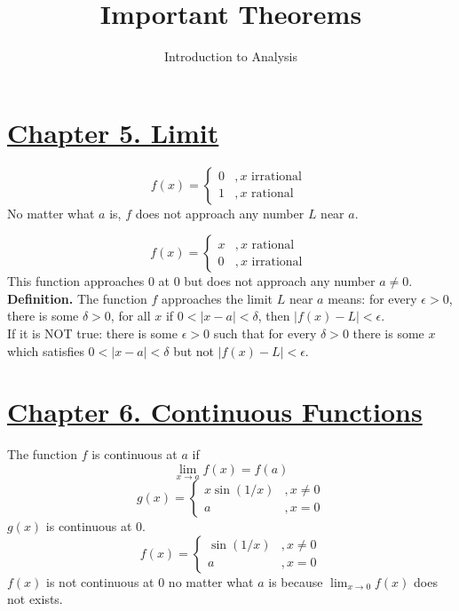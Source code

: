 \documentclass[10pt,letterpaper]{article}
\title{\textbf{Important Theorems}}
\author{Introduction to Analysis}
\begin{document}
\maketitle

\setlength{\parindent}{0pt}
\setlength{\parskip}{1ex}
	\section*{{\color{red}\underline{Chapter 5. Limit}}}
	$$f(x) = 
	\begin{cases}
	0 &, x \text{ irrational } \\
	1 &, x \text{ rational } 	
	\end{cases}
	$$
	No matter what $a$ is, $f$ does not approach any number $L$ near $a$.
	
	$$f(x) = 
	\begin{cases}
	x &, x \text{ rational } \\
	0 &, x \text{ irrational } 	
	\end{cases}
	$$
	This function approaches $0$ at $0$ but does not approach any number $a \neq 0$. \\
	\textbf{Definition. } The function $f$ approaches the limit $L$ near $a$ means: for every $\epsilon > 0$,
	there is some $\delta > 0$, for all $x$ if $0 < |x - a| < \delta$, then $|f(x) - L| < \epsilon$. \\
	If it is NOT true: there is some $\epsilon > 0$ such that for every $\delta > 0$ there is some $x$ which 
	satisfies $0 < |x - a| < \delta$ but not $|f(x) - L| < \epsilon$.
	 
	\section*{{\color{red}\underline{Chapter 6. Continuous Functions}}}
	 The function $f$ is continuous at $a$ if 
		$$\displaystyle\lim_{x\to a}f(x) = f(a)$$	
	$$g(x) = 
	\begin{cases}
	x \sin(1/x) &, x \neq 0 \\
	a &, x  = 0 	
	\end{cases}
	$$
	$g(x)$ is continuous at $0$.  \\
	
	$$f(x) = 
	\begin{cases}
	\sin(1/x) &, x \neq 0 \\
	a &, x  = 0 	
	\end{cases}$$
	$f(x)$ is not continuous at $0$ no matter what $a$ is because $\displaystyle\lim_{x\to 0}f(x)$ does not exists.
	
\end{document}
